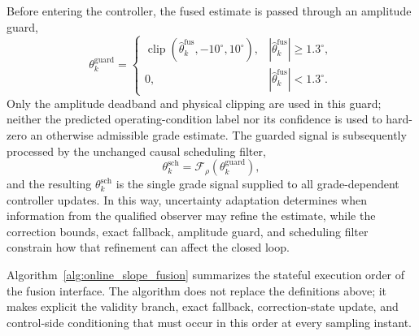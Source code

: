 \documentclass{ieeeaccess}
\begin{document}
Before entering the controller, the fused estimate is passed through an amplitude guard,
\begin{equation}
\theta_k^{\mathrm{guard}}=
\begin{cases}
\operatorname{clip}\!\left(
\hat\theta_k^{\mathrm{fus}},-10^{\circ},10^{\circ}
\right),
&|\hat\theta_k^{\mathrm{fus}}|\geq1.3^{\circ},\\
0,
&|\hat\theta_k^{\mathrm{fus}}|<1.3^{\circ}.
\end{cases}
\label{eq:fused_slope_amplitude_guard}
\end{equation}
Only the amplitude deadband and physical clipping are used in this guard; neither the predicted operating-condition label nor its confidence is used to hard-zero an otherwise admissible grade estimate. The guarded signal is subsequently processed by the unchanged causal scheduling filter,
\begin{equation}
\theta_k^{\mathrm{sch}}
=\mathcal F_{\rho}\!\left(\theta_k^{\mathrm{guard}}\right),
\label{eq:fused_slope_conditioning}
\end{equation}
and the resulting $\theta_k^{\mathrm{sch}}$ is the single grade signal supplied to all grade-dependent controller updates. In this way, uncertainty adaptation determines when information from the qualified observer may refine the estimate, while the correction bounds, exact fallback, amplitude guard, and scheduling filter constrain how that refinement can affect the closed loop.

Algorithm~\ref{alg:online_slope_fusion} summarizes the stateful execution order of the fusion interface. The algorithm does not replace the definitions above; it makes explicit the validity branch, exact fallback, correction-state update, and control-side conditioning that must occur in this order at every sampling instant.
\end{document}
